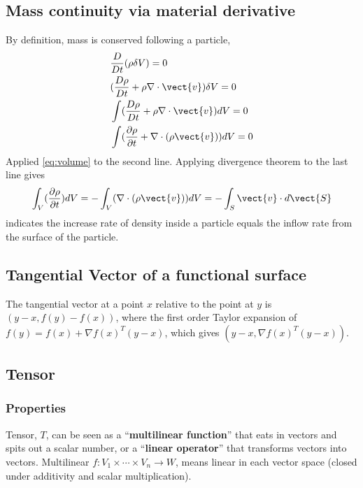 \subsection{Mass continuity via material derivative} By definition, mass is conserved following a
particle, 
%
\begin{equation} 
\begin{aligned} 
   & \frac{D}{Dt} (\rho \delta V) = 0  \\ 
   & (\frac{D\rho}{Dt} + \rho\nabla \cdot \vect{v})\delta V = 0 \\ 
   & \int(\frac{D\rho}{Dt} + \rho\nabla\cdot\vect{v})dV = 0 \\ 
   & \int(\frac{\partial\rho}{\partial t} + \nabla\cdot(\rho\vect{v}))dV = 0 \\ 
\end{aligned} 
\end{equation} 
%
Applied \eqref{eq:volume} to the second line.  Applying divergence theorem to the last line gives 
%
\begin{equation}
   \int_V(\frac{\partial\rho}{\partial t})dV = -\int_V(\nabla\cdot(\rho\vect{v}))dV = -\int_S \vect{v}
\cdot d\vect{S} 
\end{equation} 
%
indicates the increase rate of density inside a particle equals the inflow rate from the surface of
the particle.


\subsection{Tangential Vector of a functional surface} 
The tangential vector at a point $x$ relative to the point at $y$ is $(y-x,f(y)-f(x))$, where the
first order Taylor expansion of $f(y) = f(x) + \nabla f(x)^T(y-x)$, which gives $(y-x,\nabla
f(x)^T(y-x))$.  


\subsection{Tensor} 
\subsubsection{Properties} 
Tensor, $T$, can be seen as a ``{\bf multilinear function}'' that eats in vectors and spits out a
scalar number, or a ``{\bf linear operator}'' that transforms vectors into vectors.  Multilinear $f
: V_1 \times \cdots \times V_n \rightarrow W$, means linear in each vector space (closed under
additivity and scalar multiplication). \\ 

